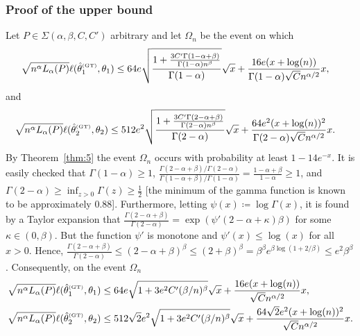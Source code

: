 \documentclass{article}
\newcommand{\1}{\boldsymbol{1}}
\theoremstyle{plain}
\begin{document}
\subsubsection{Proof of the upper bound}
\label{sec:proof-upper-bound}

  Let $P\in \Sigma(\alpha,\beta,C,C')$ arbitrary and let $\Omega_n$ be the event on which
  \begin{align*}
    \sqrt{n^{\alpha}L_{\alpha}(P)}\ell(\hat{\theta}_1^{\text{\tiny{(GT)}}},\theta_1)%
    &\leq 64e \sqrt{\frac{1 + \frac{3C'\Gamma(1-\alpha + \beta)}{\Gamma(1-\alpha)n^{\beta}}}{\Gamma(1-\alpha)}}\sqrt{x} +  \frac{16e(x + \log(n))}{\Gamma(1-\alpha)\sqrt{C}n^{\alpha/2}}x,
  \end{align*}
  and
  \begin{align*}
    \sqrt{n^{\alpha}L_{\alpha}(P)}\ell(\hat{\theta}_2^{\text{\tiny{(GT)}}},\theta_2)%
    &\leq 512e^2\sqrt{\frac{1+\frac{3C'\Gamma(2-\alpha + \beta)}{\Gamma(2-\alpha)n^{\beta}}}{\Gamma(2-\alpha)}}\sqrt{x} + \frac{64e^2(x+\log(n))^2}{\Gamma(2-\alpha)\sqrt{C}n^{\alpha/2}}x.
  \end{align*}
  By Theorem~\ref{thm:5} the event $\Omega_n$ occurs with probability at least $1-14e^{-x}$. It is easily checked that
  $\Gamma(1-\alpha) \geq 1$, $\frac{\Gamma(2-\alpha+\beta)/\Gamma(2-\alpha)}{\Gamma(1-\alpha+\beta)/\Gamma(1-\alpha)} = \frac{1-\alpha+\beta}{1-\alpha}\geq 1$, and $\Gamma(2-\alpha) \geq \inf_{z> 0}\Gamma(z) \geq \frac{1}{2}$ [the minimum of the gamma function is known to be approximately $0.88$]. Furthermore, letting $\psi(x) \coloneqq \log\Gamma(x)$, it is found by a Taylor expansion that $\frac{\Gamma(2-\alpha+\beta)}{\Gamma(2-\alpha)} = \exp(\psi'(2-\alpha + \kappa)\beta)$ for some $\kappa \in (0,\beta)$. But the function $\psi'$ is monotone and $\psi'(x) \leq \log(x)$ for all $x > 0$. Hence, $\frac{\Gamma(2-\alpha+\beta)}{\Gamma(2-\alpha)} \leq (2-\alpha+\beta)^{\beta}\leq (2+\beta)^{\beta} =\beta^{\beta}e^{\beta\log(1+2/\beta)}\leq e^2\beta^{\beta}$. Consequently, on the event $\Omega_n$
  \begin{align*}
    \sqrt{n^{\alpha}L_{\alpha}(P)}\ell(\hat{\theta}_1^{\text{\tiny{(GT)}}},\theta_1)
    &\leq 64e\sqrt{1 + 3e^2C'(\beta/n)^{\beta}}\sqrt{x} + \frac{16e(x + \log(n))}{\sqrt{C}n^{\alpha/2}}x,\\
    \sqrt{n^{\alpha}L_{\alpha}(P)}\ell(\hat{\theta}_2^{\text{\tiny{(GT)}}},\theta_2)%
    &\leq 512\sqrt{2}e^2\sqrt{1+3e^2C'(\beta/n)^{\beta}}\sqrt{x} + \frac{64\sqrt{2}e^2(x+\log(n))^2}{\sqrt{C}n^{\alpha/2}}x.
  \end{align*}
\end{document}

